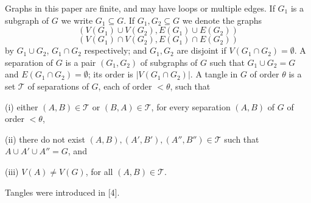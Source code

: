 
Graphs in this paper are finite, and may have loops or multiple edges. If $G_1$ is a subgraph of $G$ we write $G_1 \subseteq G$. If $G_1, G_2 \subseteq G$ we denote the graphs
\begin{equation*}
(V(G_1) \cup V(G_2), E(G_1) \cup E(G_2))
\end{equation*}
\begin{equation*}
(V(G_1) \cap V(G_2), E(G_1) \cap E(G_2))
\end{equation*}
by $G_1 \cup G_2$, $G_1 \cap G_2$ respectively; and $G_1, G_2$ are disjoint if $V(G_1 \cap G_2) = \emptyset$. A separation of $G$ is a pair $(G_1, G_2)$ of subgraphs of $G$ such that $G_1 \cup G_2 = G$ and $E(G_1 \cap G_2) = \emptyset$; its order is $|V(G_1 \cap G_2)|$. A tangle in $G$ of order $\theta$ is a set $\mathscr{T}$ of separations of $G$, each of order $<\theta$, such that

\hspace*{12pt}(i) either $(A, B) \in \mathscr{T}$ or $(B, A) \in \mathscr{T}$, for every separation $(A, B)$ of $G$ of order $<\theta$,

\hspace*{12pt}(ii) there do not exist $(A, B), (A', B'), (A'', B'') \in \mathscr{T}$ such that $A \cup A' \cup A'' = G$, and

\hspace*{12pt}(iii) $V(A) \ne V(G)$, for all $(A, B) \in \mathscr{T}$.

Tangles were introduced in [4].


